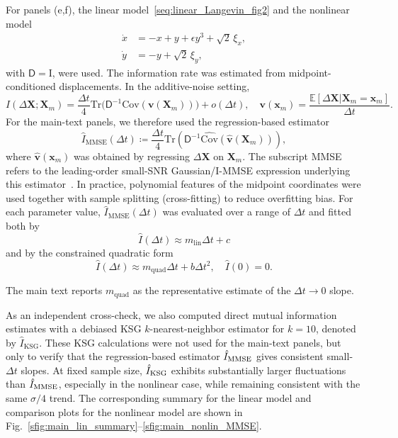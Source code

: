 \documentclass[
 longbibliography,
 twocolumn,
 superscriptaddress,
 amsmath,
 amssymb,
 amsthm,
 amsfonts,
 prl,
 floatfix,
]{revtex4-2}
\newcommand{\matbf}[1]{\boldsymbol{\mathsf{#1}}}
\begin{document}
\begin{widetext}
For panels (e,f), the linear model~\eqref{seq:linear_Langevin_fig2} and the nonlinear model
\begin{equation*}
    \begin{aligned}
        \dot x&=-x+y+\epsilon y^3+\sqrt 2\,\xi_x, \\
        \dot y&=-y+\sqrt 2\,\xi_y,
    \end{aligned}
\end{equation*}
with $\matbf D=\mathrm{I}$, were used. The information rate was estimated from midpoint-conditioned displacements. In the additive-noise setting,
\[
    I(\Delta\bm X;\bm X_m)=\frac{\Delta t}{4}
    \mathrm{Tr}\big(\matbf D^{-1}
    \mathrm{Cov}(\bm v(\bm X_m))\big)+o(\Delta t),
    \quad
    \bm v(\bm x_m)=\frac{\mathbb E[\Delta\bm X|\bm X_m=\bm x_m]}{\Delta t}.
\]
For the main-text panels, we therefore used the regression-based estimator
\begin{equation}
    \hat I_{\mathrm{MMSE}}(\Delta t)\coloneq\frac{\Delta t}{4}
    \mathrm{Tr}\left(\matbf D^{-1}\hat{\mathrm{Cov}}(\hat{\bm v}(\bm X_m))\right),
    \label{seq:I_hat_MMSE}
\end{equation}
where $\hat{\bm v}(\bm x_m)$ was obtained by regressing $\Delta\bm X$ on $\bm X_m$. The subscript MMSE refers to the leading-order small-SNR Gaussian/I-MMSE expression underlying this estimator~\cite{guo2005mutual}. In practice, polynomial features of the midpoint coordinates were used together with sample splitting (cross-fitting) to reduce overfitting bias. For each parameter value, $\hat I_{\mathrm{MMSE}}(\Delta t)$ was evaluated over a range of $\Delta t$ and fitted both by
\begin{equation}
    \hat I(\Delta t)\approx m_{\mathrm{lin}}\Delta t+c
    \label{seq:m_lin}
\end{equation}
and by the constrained quadratic form
\begin{equation}
    \hat I(\Delta t)\approx m_{\mathrm{quad}}\Delta t+b\Delta t^2,
    \quad \hat I(0)=0.
    \label{seq:m_quad}
\end{equation}

The main text reports $m_{\mathrm{quad}}$ as the representative estimate of the $\Delta t\rightarrow0$ slope.

As an independent cross-check, we also computed direct mutual information estimates with a debiased KSG $k$-nearest-neighbor estimator for $k=10$, denoted by $\hat I_{\mathrm{KSG}}$. These KSG calculations were not used for the main-text panels, but only to verify that the regression-based estimator $\hat{I}_{\rm MMSE}$ gives consistent small-$\Delta t$ slopes. At fixed sample size, $\hat{I}_{\rm KSG}$ exhibits substantially larger fluctuations than $\hat{I}_{\rm MMSE}$, especially in the nonlinear case, while remaining consistent with the same $\sigma/4$ trend. The corresponding summary for the linear model and comparison plots for the nonlinear model are shown in Fig.~\ref{sfig:main_lin_summary}--\ref{sfig:main_nonlin_MMSE}.


\end{widetext}
\end{document}
